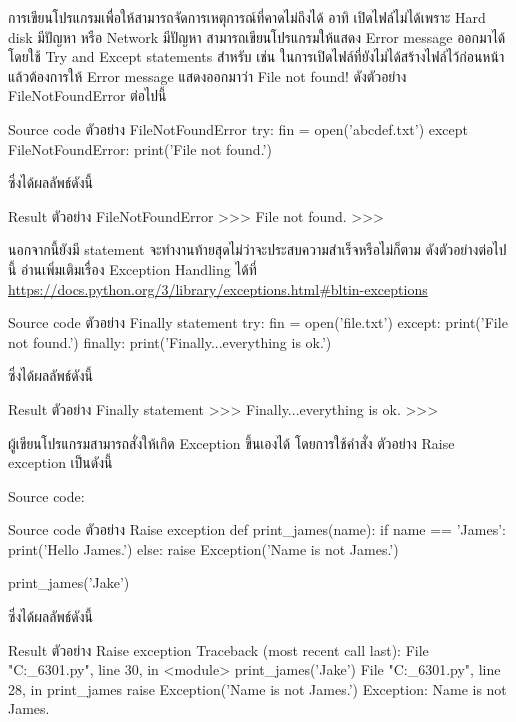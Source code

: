 การเขียนโปรแกรมเพื่อให้สามารถจัดการเหตุการณ์ที่คาดไม่ถึงได้ อาทิ เปิดไฟล์ไม่ได้เพราะ Hard disk มีปัญหา หรือ Network มีปัญหา สามารถเขียนโปรแกรมให้แสดง Error message ออกมาได้ โดยใช้ Try and Except statements สำหรับ  เช่น ในการเปิดไฟล์ที่ยังไม่ได้สร้างไฟล์ไว้ก่อนหน้า แล้วต้องการให้ Error message แสดงออกมาว่า  File not found! ดังตัวอย่าง FileNotFoundError ต่อไปนี้


\begin{codelist}{Source code ตัวอย่าง FileNotFoundError}{}
try:
    fin = open('abcdef.txt')
except FileNotFoundError:
    print('File not found.')
\end{codelist}

ซึ่งได้ผลลัพธ์ดังนี้

\begin{codelist}{Result ตัวอย่าง FileNotFoundError}{}
>>>
File not found.
>>>
\end{codelist}

นอกจากนี้ยังมี  statement จะทำงานท้ายสุดไม่ว่าจะประสบความสำเร็จหรือไม่ก็ตาม ดังตัวอย่างต่อไปนี้ อ่านเพิ่มเติมเรื่อง Exception Handling ได้ที่  
\url{https://docs.python.org/3/library/exceptions.html\#bltin-exceptions}

\begin{codelist}{Source code ตัวอย่าง Finally statement}{}
try:
    fin = open('file.txt')
except:
    print('File not found.')
finally:
    print('Finally...everything is ok.')
\end{codelist}

ซึ่งได้ผลลัพธ์ดังนี้
\begin{codelist}{Result ตัวอย่าง Finally statement}{}
>>>
Finally...everything is ok.
>>>
\end{codelist}


ผู้เขียนโปรแกรมสามารถสั่งให้เกิด Exception ขึ้นเองได้ โดยการใช้คำสั่ง  ตัวอย่าง Raise exception เป็นดังนี้

Source code:
\begin{codelist}{Source code ตัวอย่าง Raise exception}{}
def print_james(name):
    if name == 'James':
        print('Hello James.')
    else:
        raise Exception('Name is not James.')

print_james('Jake')
\end{codelist}

ซึ่งได้ผลลัพธ์ดังนี้

\begin{codelist}{Result ตัวอย่าง Raise exception}{}
Traceback (most recent call last):
  File "C:\Users\janta\OneDrive\Documents{}_63\code01.py", 
  line 30, in <module>
    print_james('Jake')
  File "C:\Users\janta\OneDrive\Documents{}_63\code01.py", 
  line 28, in print_james
    raise Exception('Name is not James.')
Exception: Name is not James.
\end{codelist}



